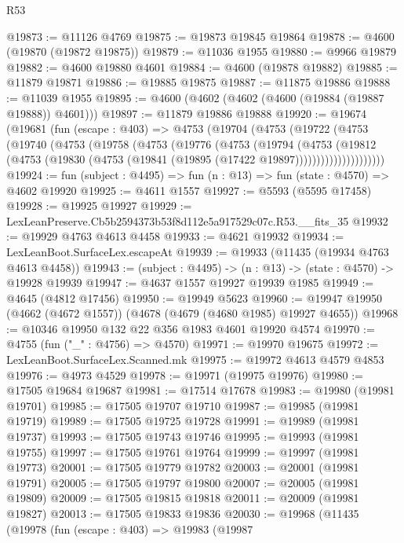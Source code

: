 \begin{lexlean}{R53}
\begin{coremodule}
@19873 := @11126 @4769
@19875 := @19873 @19845 @19864
@19878 := @4600 (@19870 (@19872 @19875))
@19879 := @11036 @1955
@19880 := @9966 @19879
@19882 := @4600 @19880 @4601
@19884 := @4600 (@19878 @19882)
@19885 := @11879 @19871
@19886 := @19885 @19875
@19887 := @11875 @19886
@19888 := @11039 @1955
@19895 := @4600 (@4602 (@4602 (@4600 (@19884 (@19887 @19888)) @4601)))
@19897 := @11879 @19886 @19888
@19920 := @19674
    (@19681
      (fun (escape : @403) =>
      @4753
        (@19704
          (@4753
            (@19722
              (@4753
                (@19740
                  (@4753
                    (@19758
                      (@4753
                        (@19776
                          (@4753
                            (@19794
                              (@4753
                                (@19812
                                  (@4753
                                    (@19830
                                      (@4753 (@19841 (@19895 (@17422 @19897)))))))))))))))))))))
@19924 := fun (subject : @4495) => fun (n : @13) => fun (state : @4570) => @4602 @19920
@19925 := @4611 @1557
@19927 := @5593 (@5595 @17458)
@19928 := @19925 @19927
@19929 := LexLeanPreserve.Cb5b2594373b53f8d112e5a917529c07c.R53.__fits_35
@19932 := @19929 @4763 @4613 @4458
@19933 := @4621 @19932
@19934 := LexLeanBoot.SurfaceLex.escapeAt
@19939 := @19933 (@11435 (@19934 @4763 @4613 @4458))
@19943 := (subject : @4495) -> (n : @13) -> (state : @4570) -> @19928 @19939
@19947 := @4637 @1557 @19927 @19939 @1985
@19949 := @4645 (@4812 @17456)
@19950 := @19949 @5623
@19960 := @19947 @19950 (@4662 (@4672 @1557)) (@4678 (@4679 (@4680 @1985) @19927 @4655))
@19968 := @10346 @19950 @132 @22 @356 @1983 @4601 @19920 @4574
@19970 := @4755 (fun ("_" : @4756) => @4570)
@19971 := @19970 @19675
@19972 := LexLeanBoot.SurfaceLex.Scanned.mk
@19975 := @19972 @4613 @4579 @4853
@19976 := @4973 @4529
@19978 := @19971 (@19975 @19976)
@19980 := @17505 @19684 @19687
@19981 := @17514 @17678
@19983 := @19980 (@19981 @19701)
@19985 := @17505 @19707 @19710
@19987 := @19985 (@19981 @19719)
@19989 := @17505 @19725 @19728
@19991 := @19989 (@19981 @19737)
@19993 := @17505 @19743 @19746
@19995 := @19993 (@19981 @19755)
@19997 := @17505 @19761 @19764
@19999 := @19997 (@19981 @19773)
@20001 := @17505 @19779 @19782
@20003 := @20001 (@19981 @19791)
@20005 := @17505 @19797 @19800
@20007 := @20005 (@19981 @19809)
@20009 := @17505 @19815 @19818
@20011 := @20009 (@19981 @19827)
@20013 := @17505 @19833 @19836
@20030 := @19968
    (@11435
      (@19978
        (fun (escape : @403) =>
        @19983
          (@19987

\end{coremodule}
\end{lexlean}
